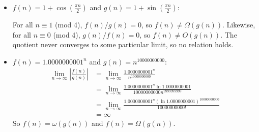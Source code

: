 \documentclass[12pt,twoside]{article}
\begin{document}
\begin{problem}{20}
{\begin{itemize}
\item $f(n) = 1+\cos\left(\frac{\pi n}{2}\right)$ and $g(n) = 1+\sin\left(\frac{\pi n}{2}\right)$:

	For all $n \equiv 1$ (mod 4), $f(n)/g(n) = 0$, so $f(n) \not= \Omega(g(n))$. Likewise, for all $n \equiv 0$ (mod 4), 
$g(n)/f(n) = 0$, so $f(n) \not= O(g(n))$.  The quotient never converges to some particular limit, so no relation holds.

\item $f(n) = {1.0000000001}^n$ and $g(n) = n^{10000000000}$:
\begin{align*}
   	\lim_{n\to\infty} \left|\frac{f(n)}{g(n)}\right|
	&= \lim_{n\to\infty} \frac{1.0000000001^n}{n^{10000000000}} \\
	&= \lim_{n\to\infty} \frac{1.0000000001^n \ln 1.0000000001}{10000000000n^{9999999999}} \\
	&= \lim_{n\to\infty} \frac{1.0000000001^n (\ln 1.0000000001)^{10000000000}}{10000000000!} \\
	&= \infty
  \end{align*}
	 So $f(n) = \omega(g(n))$ and $f(n) = \Omega(g(n))$.

	
 \end{itemize}

}


\end{problem}
\end{document}
